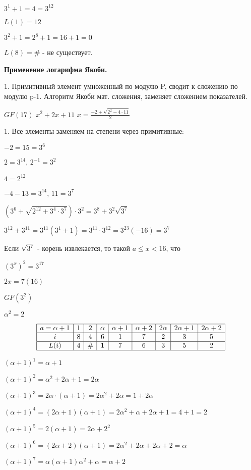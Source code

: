 \documentclass{article}
\begin{document}
$3^1+1=4=3^12$

$L(1)=12$

$3^2+1=2^8+1=16+1=0$

$L(8)=\#$ - не существует.

{\bf Применение логарифма Якоби.}

1. Примитивный элемент умноженный по модулю P, сводит к сложению по модулю p-1. Алгоритм Якоби мат. сложения, заменяет сложением показателей.

$GF(17)$ $x^2+2x+11$ $x=\frac{-2+\sqrt{2^2-4\cdot 11}}{2}$

1. Все элементы заменяем на степени через примитивные:

$-2=15=3^6$

$2=3^14$, $2^{-1}=3^2$

$4=2^{12}$

$-4-13=3^{14}$, $11=3^7$

$(3^6+\sqrt{2^{12}+3^4\cdot 3^7})\cdot 3^2=3^8+3^2\sqrt{3^7}$

$3^{12}+3^{11}=3^{11}(3^1+1)=3^{11}\cdot 3^{12}=3^{23}(-16)=3^7$

Если $\sqrt{3^7}$ - корень извлекается, то такой $a \leq x < 16$, что

$(3^x)^2=3^{17}$

$2x=7(16)$

$GF(3^2)$

$\alpha^2=2$

$$\begin{array}{|c|c|c|c|c|c|c|c|c|}
\hline
   a=\alpha+1 & 1 & 2 & \alpha & \alpha+1 & \alpha+2 & 2\alpha & 2\alpha+1 & 2\alpha+2 \\
   \hline
   i & 8 & 4 & 6 & 1 &7 & 2 & 3 & 5 \\
   \hline
   L(i) & 4 & \# & 1 & 7 & 6 & 3 & 5 & 2 \\
   \hline
\end{array}$$

$(\alpha+1)^1=\alpha+1$

$(\alpha+1)^2=\alpha^2+2\alpha+1=2\alpha$

$(\alpha+1)^3=2\alpha\cdot (\alpha+1)=2\alpha^2+2\alpha=1+2\alpha$

$(\alpha+1)^4=(2\alpha+1)(\alpha+1)=2\alpha^2+\alpha+2\alpha+1=4+1=2$

$(\alpha+1)^5=2(\alpha+1)=2\alpha+2^2$

$(\alpha+1)^6=(2\alpha+2)(\alpha+1)=2\alpha^2+2\alpha+2\alpha+2=\alpha$

$(\alpha+1)^7=\alpha(\alpha+1)\alpha^2+\alpha=\alpha+2$
\end{document}
